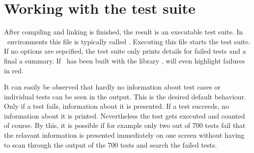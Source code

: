 %                                                                        
%                                                                        
%                                                                        
%                                                                        
%
\clearpage
\section{Working with the test suite}

After compiling and linking is finished, the result is an executable test suite. In \LibModel~environments this file is typically called . Executing this file starts the test suite. If no options are sepcified, the test suite only prints details for failed tests and a final a summary. If \projectname~has been built with the library \LibAlgebra, \projectname will even highlight failures in red. 


It can easily be observed that hardly no information about test cases or individual tests can be seen in the output. This is the desired default behaviour. Only if a test fails, information about it is presented. If a test succeeds, no information about it is printed. Nevertheless the test gets executed and counted of course. By this, it is possible if for example only two out of 700 tests fail that the relavant information is presented immediately on one screen without having to scan through the output of the 700 tests and search the failed tests.

